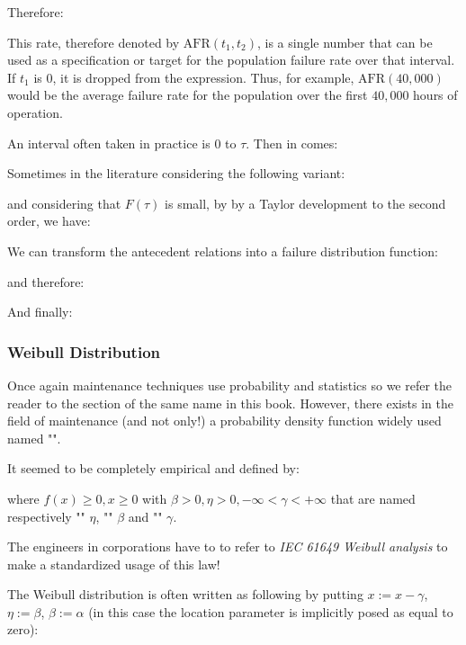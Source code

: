 	Therefore:
	
	This rate, therefore denoted by $\text{AFR}(t_1,t_2)$, is a single number that can be used as a specification or target for the population failure rate over that interval. If $t_1$ is $0$, it is dropped from the expression. Thus, for example, $\text{AFR}(40,000)$ would be the average failure rate for the population over the first $40,000$ hours of operation.  

	An interval often taken in practice is $0$ to $\tau$. Then in comes:
	
 	Sometimes in the literature considering the following variant:
	
	and considering that $F(\tau)$ is small, by by a Taylor development to the second order, we have:
	
 	We can transform the antecedent relations into a failure distribution function:
	
 	and therefore:
	
 	And finally:	
	
	
	\pagebreak
	\subsubsection{Weibull Distribution}\label{weibull distribution}
	Once again maintenance techniques use probability and statistics so we refer the reader to the section of the same name in this book. However, there exists in the field of maintenance (and not only!) a probability density function widely used named "".
	
	It seemed to be completely empirical and defined by:
	
	where $f(x)\geq 0,x\geq 0$ with $\beta >0,\eta>0,-\infty<\gamma<+\infty$ that are named respectively "" $\eta$, "" $\beta$ and ""  $\gamma$.
	
	\begin{tcolorbox}[title=Remark,colframe=black,arc=10pt]
	The engineers in corporations have to to refer to \textit{IEC 61649 Weibull analysis} to make a standardized usage of this law!
	\end{tcolorbox}	
	The Weibull distribution is often written as following by putting $x:=x-\gamma$, $\eta:=\beta$, $\beta:=\alpha$ (in this case the location parameter is implicitly posed as equal to zero):
	
